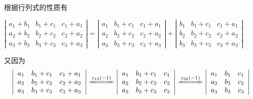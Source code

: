 \begin{solution}
    根据行列式的性质有

    $
        \left|\begin{array}{cccc}
            a_{1}+b_{1} & b_{1}+c_{1} & c_{1}+a_{1} \\
            a_{2}+b_{2} & b_{2}+c_{2} & c_{2}+a_{2} \\
            a_{3}+b_{3} & b_{3}+c_{3} & c_{3}+a_{3}
        \end{array}\right|=
        \left|\begin{array}{cccc}
            a_{1} & b_{1}+c_{1} & c_{1}+a_{1} \\
            a_{2} & b_{2}+c_{2} & c_{2}+a_{2} \\
            a_{3} & b_{3}+c_{3} & c_{3}+a_{3}
        \end{array}\right|+
        \left|\begin{array}{cccc}
            b_{1} & b_{1}+c_{1} & c_{1}+a_{1} \\
            b_{2} & b_{2}+c_{2} & c_{2}+a_{2} \\
            b_{3} & b_{3}+c_{3} & c_{3}+a_{3}
        \end{array}\right|
    $

    又因为
    $$\left|\begin{array}{cccc}
            a_{1} & b_{1}+c_{1} & c_{1}+a_{1} \\
            a_{2} & b_{2}+c_{2} & c_{2}+a_{2} \\
            a_{3} & b_{3}+c_{3} & c_{3}+a_{3}
        \end{array}\right|
        \xlongequal{c_{13}(-1)}\left|\begin{array}{cccc}
            a_{1} & b_{1}+c_{1} & c_{1} \\
            a_{2} & b_{2}+c_{2} & c_{2} \\
            a_{3} & b_{3}+c_{3} & c_{3}
        \end{array}\right|
        \xlongequal{c_{32}(-1)}\left|\begin{array}{cccc}
            a_{1} & b_{1} & c_{1} \\
            a_{2} & b_{2} & c_{2} \\
            a_{3} & b_{3} & c_{3}
        \end{array}\right|
    $$


\end{solution}
